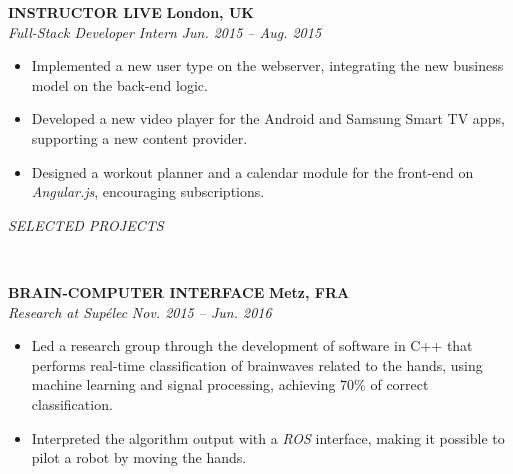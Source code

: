 \documentclass[a4paper, 12pt]{article}
\newcommand{\marginline}{-0.3cm}
\newcommand{\margincontent}{-0.6cm}
\newcommand{\marginbeforesection}{0.3cm}
\newcommand{\linewidthperso}{0.02cm}
\newcommand{\stylesection}[1]{
  \vspace{\marginbeforesection}
  \begin{normalsize}\textit{#1}\end{normalsize}
  \vspace{\marginline}\\
  \noindent\makebox[\linewidth]{\rule{\textwidth}{\linewidthperso}}

}
\newcommand{\styletitle}[1]{\textbf{#1}}
\newcommand{\styledesc}[1]{\textit{#1}}
\newcommand{\styleloc}[1]{\textbf{#1}}
\newcommand{\styledates}[1]{\textit{#1}}
\begin{document}
\begin{footnotesize}
\styletitle{INSTRUCTOR LIVE} \hfill \styleloc{London, UK}\\
\styledesc{Full-Stack Developer Intern} \hfill \styledates{Jun. 2015 -- Aug. 2015}\\
\vspace{\margincontent}
\begin{itemize}
  \item Implemented a new user type on the webserver, integrating the new business model on the back-end logic.
  \item Developed a new video player for the Android and Samsung Smart TV apps, supporting a new content provider.
  \item Designed a workout planner and a calendar module for the front-end on \textit{Angular.js}, encouraging subscriptions.
\end{itemize}


\stylesection{SELECTED PROJECTS}
   
\styletitle{BRAIN-COMPUTER INTERFACE} \hfill \styleloc{Metz, FRA}\\
\styledesc{Research at Sup\'elec} \hfill \styledates{Nov. 2015 -- Jun. 2016}\\
\vspace{\margincontent}
\begin{itemize}
  \item Led a research group through the development of software in C++ that performs real-time classification of brainwaves related to the hands, using machine learning and signal processing, achieving 70\% of correct classification.
  \item Interpreted the algorithm output with a \textit{ROS} interface, making it possible to pilot a robot by moving the hands.
\end{itemize}


\end{footnotesize}
\end{document}
